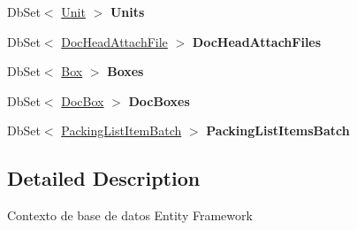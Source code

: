 \begin{DoxyCompactItemize}
\item 
\mbox{\label{class_h_k_supply_1_1_d_b_1_1_h_k_supply_context_ac73892b73ba2eebff4237b6fc74bc268}} 
Db\+Set$<$ \mbox{\hyperlink{class_h_k_supply_1_1_models_1_1_unit}{Unit}} $>$ {\bfseries Units}
\item 
\mbox{\label{class_h_k_supply_1_1_d_b_1_1_h_k_supply_context_a7f9f6abcccbba8aa86fbecc117e2033e}} 
Db\+Set$<$ \mbox{\hyperlink{class_h_k_supply_1_1_models_1_1_supply_1_1_doc_head_attach_file}{Doc\+Head\+Attach\+File}} $>$ {\bfseries Doc\+Head\+Attach\+Files}
\item 
\mbox{\label{class_h_k_supply_1_1_d_b_1_1_h_k_supply_context_ae1973e14e9d14cf4fb617b0c873e4601}} 
Db\+Set$<$ \mbox{\hyperlink{class_h_k_supply_1_1_models_1_1_supply_1_1_box}{Box}} $>$ {\bfseries Boxes}
\item 
\mbox{\label{class_h_k_supply_1_1_d_b_1_1_h_k_supply_context_aecbcc3dc9242d24e5598bb402939968c}} 
Db\+Set$<$ \mbox{\hyperlink{class_h_k_supply_1_1_models_1_1_supply_1_1_doc_box}{Doc\+Box}} $>$ {\bfseries Doc\+Boxes}
\item 
\mbox{\label{class_h_k_supply_1_1_d_b_1_1_h_k_supply_context_a91437442af36786d8989561f6864b2fb}} 
Db\+Set$<$ \mbox{\hyperlink{class_h_k_supply_1_1_models_1_1_supply_1_1_packing_list_item_batch}{Packing\+List\+Item\+Batch}} $>$ {\bfseries Packing\+List\+Items\+Batch}
\end{DoxyCompactItemize}


\subsection{Detailed Description}
Contexto de base de datos Entity Framework 




